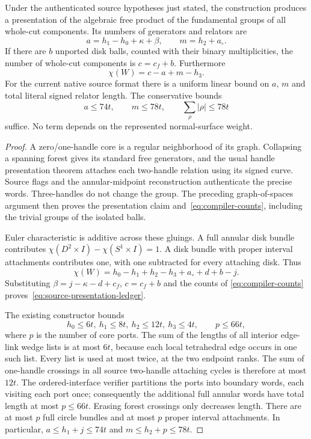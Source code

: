 \begin{theorem}
\label{thm:disk-compiler}
Under the authenticated source hypotheses just stated, the construction
produces a presentation of the algebraic free product of the fundamental
groups of all whole-cut components.  Its numbers of generators and
relators are
\begin{equation}
 a=h_1-h_0+\kappa+\beta,
 \qquad m=h_2+a_\circ.
 \label{eq:compiler-counts}
\end{equation}
If there are $b$ unported disk balls, counted with their binary
multiplicities, the number of whole-cut components is $c=c_f+b$.
Furthermore
\begin{equation}
 \chi(W)=c-a+m-h_3.
 \label{eq:source-presentation-ledger}
\end{equation}
For the current native source format there is a uniform linear bound
on $a$, $m$ and total literal signed relator length.  The conservative
bounds
\[
 a\leq74t,\qquad m\leq78t,\qquad
 \sum_{\rho}|\rho|\leq78t
\]
suffice.  No term depends on the represented normal-surface weight.
\end{theorem}
\begin{proof}
A zero/one-handle core is a regular neighborhood of its graph.  Collapsing
a spanning forest gives its standard free generators, and the usual
handle presentation theorem attaches each two-handle relation using its
signed curve.  Source flags and the annular-midpoint reconstruction
authenticate the precise words.  Three-handles do not change the group.
The preceding graph-of-spaces argument then proves the presentation claim
and~\eqref{eq:compiler-counts}, including the trivial groups of the
isolated balls.

Euler characteristic is additive across these gluings.  A full annular
disk bundle contributes $\chi(D^2\times I)-\chi(S^1\times I)=1$.
A disk bundle with proper interval attachments contributes one, with one
subtracted for every attaching disk.  Thus
\[
 \chi(W)=h_0-h_1+h_2-h_3+a_\circ+d+b-j.
\]
Substituting $\beta=j-\kappa-d+c_f$, $c=c_f+b$ and the counts of
\eqref{eq:compiler-counts} proves~\eqref{eq:source-presentation-ledger}.

The existing constructor bounds
\[
 h_0\leq6t,\ h_1\leq8t,\ h_2\leq12t,\ h_3\leq4t,
 \qquad p\leq66t,
\]
where $p$ is the number of core ports.  The sum of the lengths of all
interior edge-link wedge lists is at most $6t$, because each local
tetrahedral edge occurs in one such list.  Every list is used at most
twice, at the two endpoint ranks.  The sum of one-handle crossings in
all source two-handle attaching cycles is therefore at most $12t$.
The ordered-interface verifier partitions the ports into boundary words,
each visiting each port once; consequently the additional full annular
words have total length at most $p\leq66t$.  Erasing forest crossings
only decreases length.  There are at most $p$ full circle bundles and
at most $p$ proper interval attachments.  In particular,
$a\leq h_1+j\leq74t$ and $m\leq h_2+p\leq78t$.
\end{proof}

